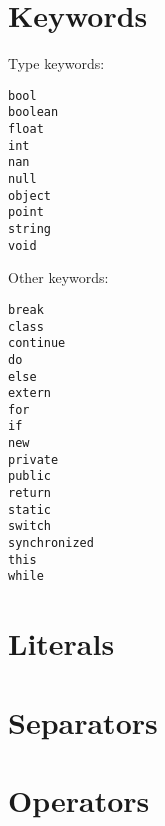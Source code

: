 \section{Keywords}

Type keywords:

\begin{lstlisting}
bool
boolean
float
int
nan
null
object
point
string
void
\end{lstlisting}

Other keywords:

\begin{lstlisting}
break
class
continue
do
else
extern
for
if
new
private
public
return
static
switch
synchronized
this
while
\end{lstlisting}


\section{Literals}
\section{Separators}
\section{Operators}
